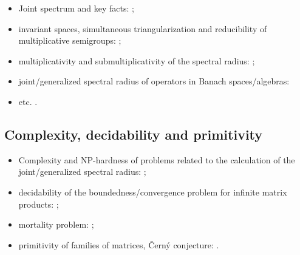 \documentclass[a4paper,fleqn]{article}
\let\cite=\citep
\begin{document}
\begin{itemize}

\item Joint spectrum and key facts: \cite{Bell:LAA05, BerWang:LAA92,
BreSert:LMS21, EE:PAMS04, GurRod:SIAMJMAA97, Lur:LAA06-2, RS:PAMS95,
Sert:Thesis16, Sert:CRMASP17};
\item invariant spaces, simultaneous triangularization and reducibility of multiplicative semigroups: \cite{Drnov:97, Drnovsek:SM97, Drn:IEOT01, GPRSTT:P10, Guinand:PAMS82, HNRRR:HJM91, LMMR:JOT98, OmRadj:LAA97, Prot:FPM96:e, Radj:IUMJ90, RRS:PAMS00, Szep:AMH86};
\item multiplicativity and submultiplicativity of the spectral radius: \cite{LR:CJM95, OmRadj:LAA97, ProtVoy:LAA17};
\item joint/generalized spectral radius of operators in Banach spaces/algebras: \cite{BD:StochDyn21, BF:AIF21, Bogdanovic:ArXiv23, BP:LMA23, EE:PAMS04, LS:LAA02, KisShulTur:20, Morris:JFA12, Muller:APM97, Pep:LMA11, Peperko:LAA12, RS:PAMS95, ShulTur:ArXiv12, ShulTur:JFA00, ShulTur:SM02, Turovskii:JFA99, TurShul:FAP00, TurShul:FAP12}
\item etc. \cite{Javaheri:JMAA13, ManSim:TCS78}.
\end{itemize}

\subsection*{Complexity, decidability and primitivity}
\begin{itemize}

\item Complexity and NP-hardness of problems related to the calculation of the joint/generalized spectral radius: \cite{AhmJun14, AhmJng:NAHS16, AltPar:CDC19, AltPar:SIAMJCO20, BGT:IEEETAC00, BJ:CANT10, BJP:IEEETIT06, BN:SIAMJMAA09, BT:Autom00, ChangPhD12, CB:NA13, CHJ:SIAMJCO15, HMS:MPCPS13, Jungers:09, PJ:CDC13, Theys:PhD05, TB:MCSS97-4, TB:MCSS97-1, Toker:AJIFAC97};
\item decidability of the boundedness/convergence problem for infinite matrix products: \cite{AKKK:92:e, BBKPT:TCS01, BC:TCS03, BT:SCL00, CiconePhD11, Cicone:ArXiv15, JPB:LAA08, Koz:AiT90:6:e, Koz:AiT03:9:e, Koz:ArXiv13, VlasJung:SCL14};
\item mortality problem: \cite{BBKPT:TCS01, BT:IPL97, BB:TCS02, Saouter:inria96};
\item primitivity of families of matrices, \v{C}ern\'{y} conjecture: \cite{BJO:AJIFAC15, CosJun:LNCS18, CosJun:IJFCS20, ProtVoyn:LAA12, Jungers:LAA12}.
\end{itemize}
\end{document}

